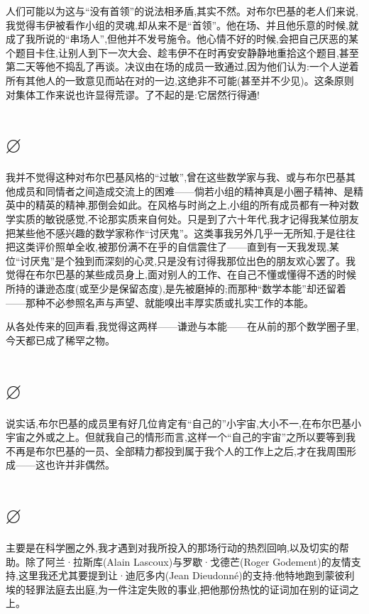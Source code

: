 人们可能以为这与“没有首领”的说法相矛盾,其实不然。对布尔巴基的老人们来说,我觉得韦伊被看作小组的灵魂,却从来不是“首领”。他在场、并且他乐意的时候,就成了我所说的“串场人”,但他并不发号施令。他心情不好的时候,会把自己厌恶的某个题目卡住,让别人到下一次大会、趁韦伊不在时再安安静静地重拾这个题目,甚至第二天等他不捣乱了再谈。决议由在场的成员一致通过,因为他们认为:一个人逆着所有其他人的一致意见而站在对的一边,这绝非不可能(甚至并不少见)。这条原则对集体工作来说也许显得荒谬。了不起的是:它居然行得通!

\section{$\varnothing$}

我并不觉得这种对布尔巴基风格的“过敏”,曾在这些数学家与我、或与布尔巴基其他成员和同情者之间造成交流上的困难——倘若小组的精神真是小圈子精神、是精英中的精英的精神,那倒会如此。在风格与时尚之上,小组的所有成员都有一种对数学实质的敏锐感觉,不论那实质来自何处。只是到了六十年代,我才记得我某位朋友把某些他不感兴趣的数学家称作“讨厌鬼”。这类事我另外几乎一无所知,于是往往把这类评价照单全收,被那份满不在乎的自信震住了——直到有一天我发现,某位“讨厌鬼”是个独到而深刻的心灵,只是没有讨得我那位出色的朋友欢心罢了。我觉得在布尔巴基的某些成员身上,面对别人的工作、在自己不懂或懂得不透的时候所持的谦逊态度(或至少是保留态度),是先被磨掉的;而那种“数学本能”却还留着——那种不必参照名声与声望、就能嗅出丰厚实质或扎实工作的本能。

从各处传来的回声看,我觉得这两样——谦逊与本能——在从前的那个数学圈子里,今天都已成了稀罕之物。

\section{$\varnothing$}

说实话,布尔巴基的成员里有好几位肯定有“自己的”小宇宙,大小不一,在布尔巴基小宇宙之外或之上。但就我自己的情形而言,这样一个“自己的宇宙”之所以要等到我不再是布尔巴基的一员、全部精力都投到属于我个人的工作上之后,才在我周围形成——这也许并非偶然。

\section{$\varnothing$}

主要是在科学圈之外,我才遇到对我所投入的那场行动的热烈回响,以及切实的帮助。除了阿兰·拉斯库(Alain Lascoux)与罗歇·戈德芒(Roger Godement)的友情支持,这里我还尤其要提到让·迪厄多内(Jean Dieudonné)的支持:他特地跑到蒙彼利埃的轻罪法庭去出庭,为一件注定失败的事业,把他那份热忱的证词加在别的证词之上。

